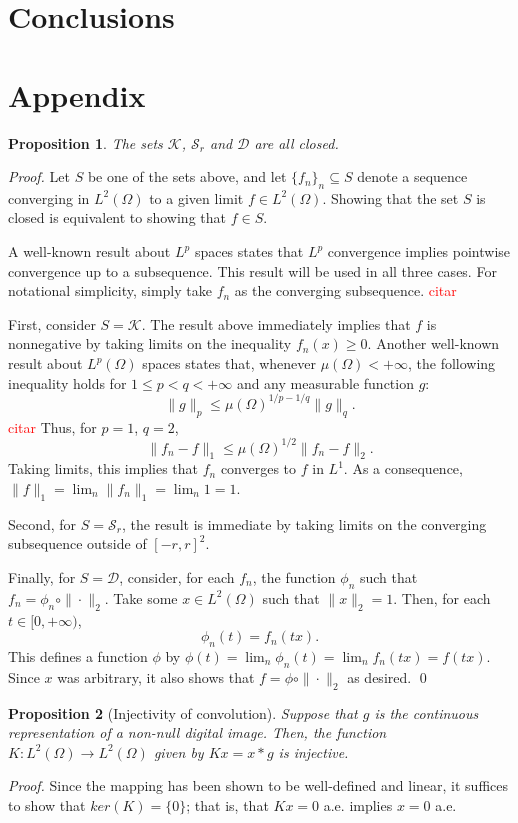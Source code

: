 \documentclass[twocolumn,twoside,a4paper,10pt]{IEEEtran}
\newtheorem{proposition}{Proposition}
\newcommand{\Frank}[1]{\textcolor{red}{#1}}
\begin{document}
\section{Conclusions}

\section{Appendix}

\begin{proposition}\label{prop:closed-sets}
  The sets \(\mathcal{K}\), \(\mathcal{S}_r\) and \(\mathcal{D}\) are all closed.
\end{proposition}
\textit{Proof.} 
Let \(S\) be one of the sets above, and let \(\{f_n\}_n\subseteq S\) denote a sequence converging in \(L^2(\Omega)\) to a given limit \(f\in L^2(\Omega)\). Showing that the set \(S\) is closed is equivalent to showing that \(f\in S\).

A well-known result about \(L^p\) spaces states that \(L^p\) convergence implies pointwise convergence up to a subsequence. This result will be used in all three cases. For notational simplicity, simply take \(f_n\) as the converging subsequence. \Frank{citar}

First, consider \(S=\mathcal{K}\). The result above immediately implies that \(f\) is nonnegative by taking limits on the inequality \(f_n(x) \geq 0\). Another well-known result about \(L^p(\Omega)\) spaces states that, whenever \(\mu(\Omega)<+\infty\), the following inequality holds for \(1\leq p < q < +\infty\) and any measurable function \(g\):
\[
  \|g\|_p \leq \mu(\Omega)^{1/p - 1/q} \|g\|_q
.\]
\Frank{citar}
Thus, for \(p=1\), \(q=2\),
\[
  \|f_n-f\|_1 \leq \mu(\Omega)^{1/2}\|f_n - f\|_2
.\]
Taking limits, this implies that \(f_n\) converges to \(f\) in \(L^1\). As a consequence, \(\|f\|_{1}=\lim_n \|f_n\|_{1}=\lim_n 1 = 1\).

Second, for \(S=\mathcal{S}_r\), the result is immediate by taking limits on the converging subsequence outside of \([-r, r]^2\).

Finally, for \(S=\mathcal{D}\), consider, for each \(f_n\), the function \(\phi_n\) such that \(f_n=\phi_n \circ \|\cdot\|_{2}\). Take some \(x\in L^2(\Omega)\) such that \(\|x\|_{2}=1\). Then, for each \(t\in[0, +\infty)\),
\[
  \phi_n(t) = f_n(tx)
.\]
This defines a function \(\phi\) by \(\phi(t)=\lim_n\phi_n(t)=\lim_nf_n(tx)=f(tx)\). Since \(x\) was arbitrary, it also shows that \(f=\phi\circ\|\cdot\|_{2}\) as desired. \qed

\begin{proposition}[Injectivity of convolution]\label{prop:injectivity-of-convolution}
  Suppose that \(g\) is the continuous representation of a non-null digital image. Then, the function \(K\colon L^2(\Omega)\to L^2(\Omega)\) given by \(Kx = x\ast g\) is injective.
\end{proposition}
\textit{Proof. } Since the mapping has been shown to be well-defined and linear, it suffices to show that \(ker(K)=\{0\}\); that is, that \(Kx=0\) a.e. implies \(x=0\) a.e.
\end{document}
